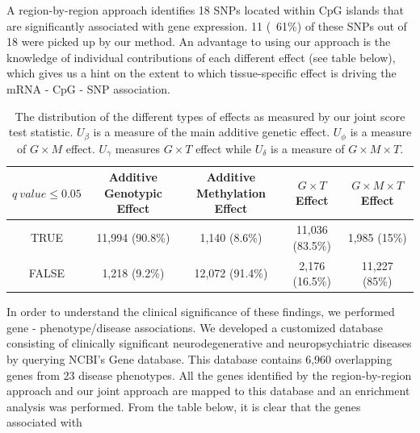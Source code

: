 \documentclass[hidelinks]{article}
\begin{document}
A region-by-region approach identifies 18 SNPs located within CpG islands that are significantly associated with gene expression. 11 (~61\%) of these SNPs out of 18 were picked up by our method. An advantage to using our approach is the knowledge of individual contributions of each different effect (see table below), which gives us a hint on the extent to which tissue-specific effect is driving the mRNA - CpG - SNP association. 

\begin{table}[H]
\begin{center}
\begin{tabular}{| c | c | c | c | c |}
\hline
$q~value \leq 0.05$ & Additive Genotypic Effect & Additive Methylation Effect & $G \times T$ Effect & $G \times M \times T$ Effect \\ \hline \hline
TRUE & 11,994 (90.8\%) &  1,140 (8.6\%) & 11,036 (83.5\%) & 1,985 (15\%) \\ \hline
FALSE & 1,218 (9.2\%) & 12,072 (91.4\%) & 2,176 (16.5\%) & 11,227 (85\%) \\ \hline
\hline\hline
\end{tabular}
\end{center}
\caption{The distribution of the different types of effects as measured by our joint score test statistic. $U_\beta$ is a measure of the main additive genetic effect. $U_\phi$ is a measure of $G \times M$ effect. $U_\gamma$ measures $G \times T$ effect while $U_\delta$ is a measure of $G \times M \times T$.}
\end{table}

In order to understand the clinical significance of these findings, we performed gene - phenotype/disease associations. We developed a customized database consisting of clinically significant neurodegenerative and neuropsychiatric diseases by querying NCBI's Gene database. This database contains 6,960 overlapping genes from 23 disease phenotypes. All the genes identified by the region-by-region approach and our joint approach are mapped to this database and an enrichment analysis was performed. From the table below, it is clear that the genes associated with 
\end{document}
